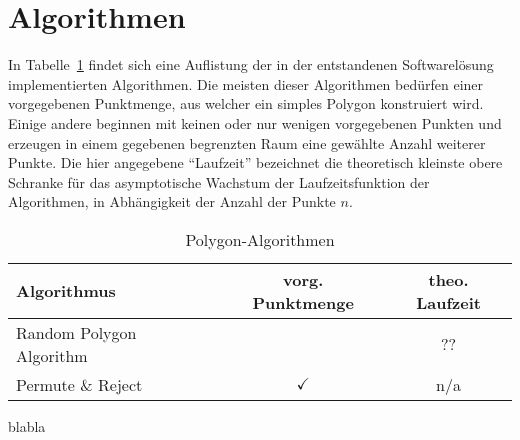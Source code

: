 \section{Algorithmen}
In Tabelle~\ref{algo_table} findet sich eine Auflistung der in der entstandenen Softwarelösung implementierten Algorithmen. Die meisten dieser Algorithmen bedürfen einer vorgegebenen Punktmenge, aus welcher ein simples Polygon konstruiert wird. Einige andere beginnen mit keinen oder nur wenigen vorgegebenen Punkten und erzeugen in einem gegebenen begrenzten Raum eine gewählte Anzahl weiterer Punkte. Die hier angegebene \enquote{Laufzeit} bezeichnet die theoretisch kleinste obere Schranke für das asymptotische Wachstum der Laufzeitsfunktion der Algorithmen, in Abhängigkeit der Anzahl der Punkte $n$.
\begin{table}[ht]
\begin{center}
\caption{Polygon-Algorithmen}
\begin{tabular}{lcc} 
\toprule
Algorithmus & vorg. Punktmenge & theo. Laufzeit \\
\midrule
Random Polygon Algorithm & & ?? \\
Permute \& Reject & $\checkmark$ & n/a \\
\bottomrule
\end{tabular}
\label{algo_table}
\end{center}
\end{table}
blabla
